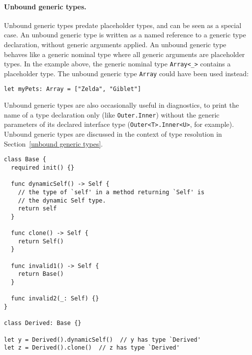 \documentclass[../generics]{subfiles}
\begin{document}
\paragraph{Unbound generic types.}
Unbound generic types predate placeholder types, and can be seen as a special case. An unbound generic type is written as a named reference to a generic type declaration, without generic arguments applied. An unbound generic type behaves like a generic nominal type where all generic arguments are placeholder types. In the example above, the generic nominal type \texttt{Array<\_>} contains a placeholder type. The unbound generic type \texttt{Array} could have been used instead:
\begin{Verbatim}
let myPets: Array = ["Zelda", "Giblet"]
\end{Verbatim}
Unbound generic types are also occasionally useful in diagnostics, to print the name of a type declaration only (like \texttt{Outer.Inner}) without the generic parameters of its declared interface type (\texttt{Outer<T>.Inner<U>}, for example). Unbound generic types are discussed in the context of type resolution in Section~\ref{unbound generic types}.

\begin{listing}\label{dynamic self example}
\begin{Verbatim}
class Base {
  required init() {}
  
  func dynamicSelf() -> Self {
    // the type of `self' in a method returning `Self' is
    // the dynamic Self type.
    return self
  }

  func clone() -> Self {
    return Self()
  }
  
  func invalid1() -> Self {
    return Base()
  }
  
  func invalid2(_: Self) {}
}

class Derived: Base {}

let y = Derived().dynamicSelf()  // y has type `Derived'
let z = Derived().clone()  // z has type `Derived'
\end{Verbatim}
\end{listing}
\end{document}
